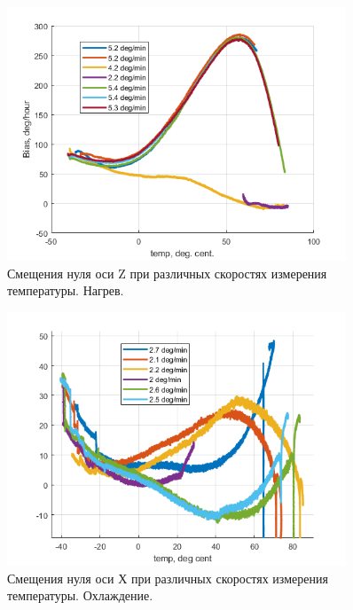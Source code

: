 \documentclass[a4paper,12pt]{article}
\begin{document}
\begin{figure}[h]
\centering
\includegraphics[width=0.9\textwidth]{continius_wz_up.png} 
\caption{\label{fig:continius_wz_up}Смещения нуля оси Z при различных скоростях измерения температуры. Нагрев.}
\end{figure}
\begin{figure}[h]
\centering
\includegraphics[width=0.9\textwidth]{continius_wx_down.png} 
\caption{\label{fig:continius_wx_down}Смещения нуля оси Х при различных скоростях измерения температуры. Охлаждение.}
\end{figure}
\end{document}

